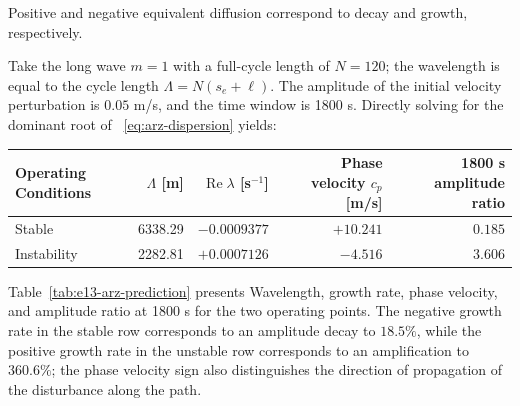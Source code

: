 \documentclass[11pt,a4paper,openany]{book}
\numberwithin{equation}{chapter}
\numberwithin{figure}{chapter}
\numberwithin{table}{chapter}
\newcommand{\tabletext}[2]{%
  \par\smallskip\noindent
  Table~\ref{#1} presents #2
\par\smallskip
}
\begin{document}
Positive and negative equivalent diffusion correspond to decay and growth, respectively.




Take the long wave $m=1$ with a full-cycle length of $N=120$; the wavelength is equal to the cycle length $\Lambda=N(s_e+\ell)$. The amplitude of the initial velocity perturbation is $0.05$ m/s, and the time window is 1800 s. Directly solving for the dominant root of ~\eqref{eq:arz-dispersion} yields:







\begin{center}
\small
{}
\label{tab:e13-arz-prediction}
\begin{tabular}{lrrrr}
\toprule







Operating Conditions




& $\Lambda$ [m] & $\operatorname{Re}\lambda$ [s$^{-1}$] &




 Phase velocity $c_p$ [m/s]




&




1800 s amplitude ratio



\\
\midrule







Stable




& 6338.29 & $-0.0009377$ & $+10.241$ & $0.185$ \\







Instability& 2282.81 & $+0.0007126$ & $-4.516$ & $3.606$ \\
\bottomrule
\end{tabular}
\end{center}
\tabletext{tab:e13-arz-prediction}{Wavelength, growth rate, phase velocity, and amplitude ratio at 1800 s for the two operating points. The negative growth rate in the stable row corresponds to an amplitude decay to $18.5\%$, while the positive growth rate in the unstable row corresponds to an amplification to $360.6\%$; the phase velocity sign also distinguishes the direction of propagation of the disturbance along the path.
}
\end{document}
